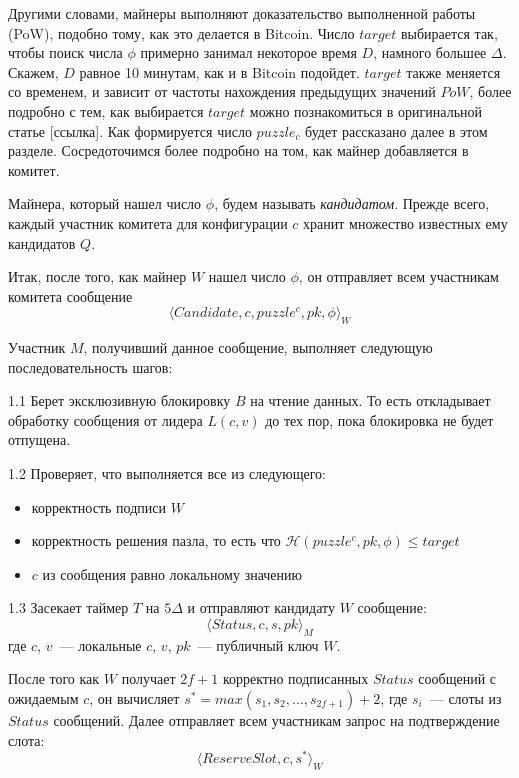 Другими словами, майнеры выполняют доказательство выполненной работы (PoW), подобно тому, как это делается в Bitcoin.  Число $target$ выбирается так, чтобы поиск числа $\phi$ примерно занимал некоторое время $D$, намного большее $\Delta$. Скажем, $D$ равное 10 минутам, как и в Bitcoin подойдет.  $target$ также меняется со временем, и зависит от частоты нахождения предыдущих значений $PoW$, более подробно с тем, как выбирается $target$ можно познакомиться в оригинальной статье [ссылка].
Как формируется число $puzzle_c$ будет рассказано далее в этом разделе. Сосредоточимся более подробно на том, как майнер добавляется в комитет.

Майнера, который нашел число $\phi$, будем называть \textit{кандидатом}.
Прежде всего, каждый участник комитета для конфигурации $c$ хранит множество известных ему кандидатов $Q$.
\vspace{10pt}

Итак, после того, как майнер $W$ нашел число $\phi$, он отправляет всем участникам комитета сообщение
 \[ \langle Candidate, c, puzzle^c, pk, \phi \rangle_W \]
 
Участник $M$, получивший данное сообщение, выполняет следующую последовательность шагов:

1.1 Берет эксклюзивную блокировку $B$ на чтение данных. То есть откладывает обработку сообщения от лидера $L(c, v)$ до тех пор, пока блокировка не будет отпущена. 

1.2 Проверяет, что выполняется все из следующего:
\begin{itemize}
\item корректность подписи $W$ 
\item корректность решения пазла, то есть что $\mathcal{H}(puzzle^c, pk, \phi) \le target$
\item $c$ из сообщения равно локальному значению
\end{itemize}

1.3 Засекает таймер $T$ на $5\Delta$ и отправляют кандидату $W$ сообщение:
 \[ \langle Status, c, s, pk \rangle_M \]
где $c$, $v$~--- локальные  $c$, $v$, $pk$~--- публичный ключ $W$.
\vspace{10pt}

После того как $W$ получает $2f+1$ корректно подписанных $Status$ сообщений с ожидаемым $c$, он вычисляет $s^{*}=max(s_1, s_2,..., s_{2f+1})+2$, где $s_i$~--- слоты из $Status$ сообщений.
Далее отправляет всем участникам запрос на подтверждение слота:
 \[ \langle ReserveSlot, c, s^{*} \rangle_W \]
 

